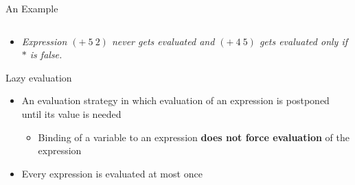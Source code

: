 \documentclass[xcolor=x11names,compress,mathserif]{beamer}
\renewcommand{\(}{\begin{columns}}
\renewcommand{\)}{\end{columns}}
\newcommand{\<}[1]{\begin{column}{#1}}
\renewcommand{\>}{\end{column}}
\begin{document}
\begin{frame}{An Example}
  \begin{columns}
    \begin{column}{0.5\textwidth}
      \begin{boxedminipage}{\textwidth}
        {\scalebox{0.75}{\sf
	\renewcommand{\arraystretch}{1}{
	  \begin{uprogram}
            \UNL{0} \hspace*{-.49\TAL} $\pi_\mainpgm$ : (\LET\ \pz\   $\leftarrow$(\CONS\ ($+$\ $4$ $5$)\
            \UNL{0} \;\;\;\;\;\;\;\;\;\;\;\;\;\;\;\;\;\;\;\;\;\;\; (\CONS\ ($+$\ $5$ $2$) \NIL)) \IN
	    \UNL{0} \;\;\;\;\;\;\;\;\;\;\;\;(\SIF\ $*$\ 
	    \UNL{1} \;\;\;\;\;\;\;\;\;\;\;\; $\pi_1$: (\plength\ \pz\ )
	    \UNL{1} \;\;\;\;\;\;\;\;\;\;\;\; $\pi_2$: (\pfun\ \pz\ )))
       	  \end{uprogram}
        }}}
      \end{boxedminipage}
    \end{column}
    \begin{column}{0.5\textwidth}
    \end{column}
  \end{columns}
    
\bigskip
\begin{itemize}
\item<1->{\em  Expression $(+\ 5\ 2)$ never gets evaluated and $(+\ 4\ 5)$ gets evaluated only if $*$ is false.}  
\end{itemize}
\end{frame}

\begin{frame} {Lazy evaluation}
\begin{itemize}
\item An evaluation  strategy in which evaluation of  an expression is
  postponed until its value is needed
  \begin{itemize}
  \item Binding  of a  variable to  an expression  {\bf does  not force
    evaluation} of the expression
  \end{itemize}
\item Every expression is evaluated at most once
\end{itemize}
\end{frame}
\end{document}
